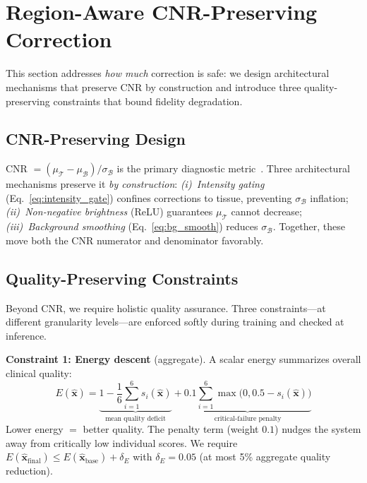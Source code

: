 \documentclass[journal,twoside,web]{ieeecolor}
\begin{document}
\section{Region-Aware CNR-Preserving Correction}
\label{sec:cnr}

This section addresses \emph{how much} correction is safe: we design architectural mechanisms that preserve CNR by construction and introduce three quality-preserving constraints that bound fidelity degradation.

\subsection{CNR-Preserving Design}
\label{sec:cnr_design}
CNR $= (\mu_\mathcal{T} - \mu_\mathcal{B})/\sigma_\mathcal{B}$ is the primary diagnostic metric~\cite{rodriguez2020generalized}. Three architectural mechanisms preserve it \emph{by construction}: \emph{(i)~Intensity gating} (Eq.~\eqref{eq:intensity_gate}) confines corrections to tissue, preventing $\sigma_\mathcal{B}$ inflation; \emph{(ii)~Non-negative brightness} (ReLU) guarantees $\mu_\mathcal{T}$ cannot decrease; \emph{(iii)~Background smoothing} (Eq.~\eqref{eq:bg_smooth}) reduces $\sigma_\mathcal{B}$. Together, these move both the CNR numerator and denominator favorably.

\subsection{Quality-Preserving Constraints}
\label{sec:formal}
Beyond CNR, we require holistic quality assurance. Three constraints---at different granularity levels---are enforced softly during training and checked at inference.

\textbf{Constraint 1: Energy descent} (aggregate). A scalar energy summarizes overall clinical quality:
\begin{equation}
E(\hat{\mathbf{x}}) = \underbrace{1 - \frac{1}{6}\sum_{i=1}^{6} s_i(\hat{\mathbf{x}})}_{\text{mean quality deficit}} + \underbrace{0.1 \sum_{i=1}^{6} \max\big(0, 0.5 - s_i(\hat{\mathbf{x}})\big)}_{\text{critical-failure penalty}}
\label{eq:energy}
\end{equation}
Lower energy $=$ better quality. The penalty term (weight $0.1$) nudges the system away from critically low individual scores. We require $E(\hat{\mathbf{x}}_\text{final}) \leq E(\hat{\mathbf{x}}_\text{base}) + \delta_E$ with $\delta_E = 0.05$ (at most 5\% aggregate quality reduction).
\end{document}

